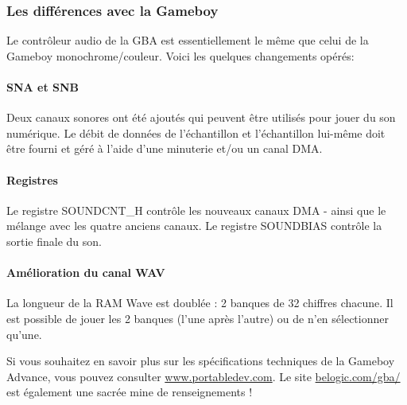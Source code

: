 \subsubsection{Les différences avec la Gameboy}

Le contrôleur audio de la GBA est essentiellement le même que celui de la Gameboy monochrome/couleur.
Voici les quelques changements opérés:

\paragraph{SNA et SNB} Deux canaux sonores ont été ajoutés qui peuvent être utilisés pour jouer du son numérique.
                      Le débit de données de l'échantillon et l'échantillon lui-même doit être fourni et géré à l'aide d'une minuterie et/ou un canal DMA.

\paragraph{Registres} Le registre SOUNDCNT\_H contrôle les nouveaux canaux DMA - ainsi que le mélange avec les quatre anciens canaux.
                      Le registre SOUNDBIAS contrôle la sortie finale du son.

\paragraph{Amélioration du canal WAV} La longueur de la RAM Wave est doublée : 2 banques de 32 chiffres chacune.
                      Il est possible de jouer les 2 banques (l'une après l'autre) ou de n'en sélectionner qu'une.

\medskip
Si vous souhaitez en savoir plus sur les spécifications techniques de la Gameboy Advance,
vous pouvez consulter \href{http://www.portabledev.com/media/GBA/tutoriels/gbatek.htm}{www.portabledev.com}.
Le site \href{http://belogic.com/gba/}{belogic.com/gba/} est également une sacrée mine de renseignements !
